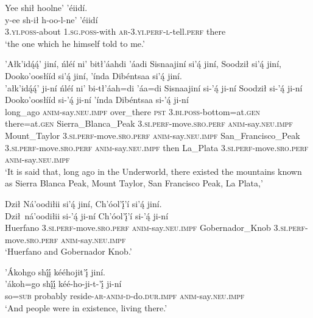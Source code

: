 \ea\label{ex:text4-1-6}
Yee shił hoolne’ ’éiidí.\\
\gll y-ee	sh-ił	h-oo-l-ne’	’éiidí\\
     3.\textsc{yi}.\textsc{poss}-about	1.\textsc{sg}.\textsc{poss}-with	\textsc{ar}-3.\textsc{yi}.\textsc{perf}-\textsc{l}-tell.\textsc{perf}	there\\
\glt `the one which he himself told to me.'
\z

\ea\label{ex:text4-2-1}
’Ałk’idą́ą́’ jiní, ńléí ni’ bitł’áahdi ’áadi Sisnaajiní si’ą́ jiní, Soodził si’ą́ jiní, Dooko’oosłííd si’ą́ jiní, ’índa Dibéntsaa si’ą́ jiní.\\
\gll ’ałk’idą́ą́’	ji-ní	ńléí	ni’	bi-tł’áah=di	’áa=di	Sisnaajiní	si-’ą́	ji-ní	Soodził	si-’ą́	ji-ní	Dooko’oosłííd	si-’ą́	ji-ní	’índa	Dibéntsaa	si-’ą́	ji-ní\\
     long\_ago	\textsc{anim}-say.\textsc{neu}.\textsc{impf}	over\_there	\textsc{pst}	3.\textsc{bi}.\textsc{poss}-bottom=at.\textsc{gen}	there=at.\textsc{gen}	Sierra\_Blanca\_Peak	3.\textsc{si}.\textsc{perf}-move.\textsc{sro}.\textsc{perf}	\textsc{anim}-say.\textsc{neu}.\textsc{impf}	Mount\_Taylor	3.\textsc{si}.\textsc{perf}-move.\textsc{sro}.\textsc{perf}	\textsc{anim}-say.\textsc{neu}.\textsc{impf}	San\_Francisco\_Peak	3.\textsc{si}.\textsc{perf}-move.\textsc{sro}.\textsc{perf}	\textsc{anim}-say.\textsc{neu}.\textsc{impf}	then	La\_Plata	3.\textsc{si}.\textsc{perf}-move.\textsc{sro}.\textsc{perf}	\textsc{anim}-say.\textsc{neu}.\textsc{impf}\\
\glt `It is said that, long ago in the Underworld, there existed the mountains known as Sierra Blanca Peak, Mount Taylor, San Francisco Peak, La Plata,'
\z

\ea\label{ex:text4-2-2}
Dził Ná’oodiłii si’ą́ jiní, Ch’óol’į́’í si’ą́ jiní.\\
\gll Dził~{ná’oodiłii}	si-’ą́	ji-ní	Ch’óol’į́’í	si-’ą́	ji-ní\\
     Huerfano	3.\textsc{si}.\textsc{perf}-move.\textsc{sro}.\textsc{perf}	\textsc{anim}-say.\textsc{neu}.\textsc{impf}	Gobernador\_Knob	3.\textsc{si}.\textsc{perf}-move.\textsc{sro}.\textsc{perf}	\textsc{anim}-say.\textsc{neu}.\textsc{impf}\\
\glt `Huerfano and Gobernador Knob.'
\z

\ea\label{ex:text4-2-3}
’Ákohgo shį́į́ kééhojit’į́ jiní.\\
\gll ’ákoh=go	shį́į́	kéé-ho-ji-t-’į́	ji-ní\\
     so=\textsc{sub}	probably	reside-\textsc{ar}-\textsc{anim}-\textsc{d}-do.\textsc{dur}.\textsc{impf}	\textsc{anim}-say.\textsc{neu}.\textsc{impf}\\
\glt `And people were in existence, living there.'
\z

